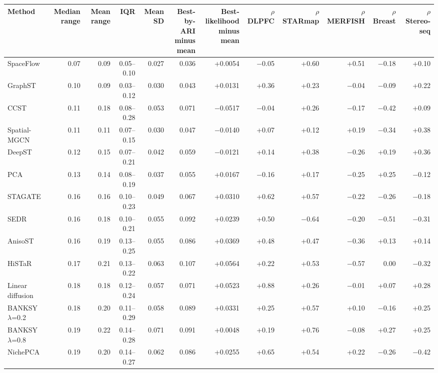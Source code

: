 \scriptsize
\begin{tabular}{lrrrrrrrrrrr}
\toprule
Method & Median range & Mean range & IQR & Mean SD & \shortstack{Best-by-ARI\\minus mean} & \shortstack{Best-likelihood\\minus mean} & \shortstack{$\rho$\\DLPFC} & \shortstack{$\rho$\\STARmap} & \shortstack{$\rho$\\MERFISH} & \shortstack{$\rho$\\Breast} & \shortstack{$\rho$\\Stereo-seq} \\
\midrule
SpaceFlow & 0.07 & 0.09 & 0.05--0.10 & 0.027 & 0.036 & +0.0054 & $-$0.05 & +0.60 & +0.51 & $-$0.18 & +0.10 \\
GraphST & 0.10 & 0.09 & 0.03--0.12 & 0.030 & 0.043 & +0.0131 & +0.36 & +0.23 & $-$0.04 & $-$0.09 & +0.22 \\
CCST & 0.11 & 0.18 & 0.08--0.28 & 0.053 & 0.071 & $-$0.0517 & $-$0.04 & +0.26 & $-$0.17 & $-$0.42 & +0.09 \\
Spatial-MGCN & 0.11 & 0.11 & 0.07--0.15 & 0.030 & 0.047 & $-$0.0140 & +0.07 & +0.12 & +0.19 & $-$0.34 & +0.38 \\
DeepST & 0.12 & 0.15 & 0.07--0.21 & 0.042 & 0.059 & $-$0.0121 & +0.14 & +0.38 & $-$0.26 & +0.19 & +0.36 \\
PCA & 0.13 & 0.14 & 0.08--0.19 & 0.037 & 0.055 & +0.0167 & $-$0.16 & +0.17 & $-$0.25 & +0.25 & $-$0.12 \\
STAGATE & 0.16 & 0.16 & 0.10--0.23 & 0.049 & 0.067 & +0.0310 & +0.62 & +0.57 & $-$0.22 & $-$0.26 & $-$0.18 \\
SEDR & 0.16 & 0.18 & 0.10--0.21 & 0.055 & 0.092 & +0.0239 & +0.50 & $-$0.64 & $-$0.20 & $-$0.51 & $-$0.31 \\
AnisoST & 0.16 & 0.19 & 0.13--0.25 & 0.055 & 0.086 & +0.0369 & +0.48 & +0.47 & $-$0.36 & +0.13 & +0.14 \\
HiSTaR & 0.17 & 0.21 & 0.13--0.22 & 0.063 & 0.107 & +0.0564 & +0.22 & +0.53 & $-$0.57 & 0.00 & $-$0.32 \\
Linear diffusion & 0.18 & 0.18 & 0.12--0.24 & 0.057 & 0.071 & +0.0523 & +0.88 & +0.26 & $-$0.01 & +0.07 & +0.28 \\
BANKSY $\lambda$=0.2 & 0.18 & 0.20 & 0.11--0.29 & 0.058 & 0.089 & +0.0331 & +0.25 & +0.57 & +0.10 & $-$0.16 & +0.25 \\
BANKSY $\lambda$=0.8 & 0.19 & 0.22 & 0.14--0.28 & 0.071 & 0.091 & +0.0048 & +0.19 & +0.76 & $-$0.08 & +0.27 & +0.25 \\
NichePCA & 0.19 & 0.20 & 0.14--0.27 & 0.062 & 0.086 & +0.0255 & +0.65 & +0.54 & +0.22 & $-$0.26 & $-$0.42 \\
\bottomrule
\end{tabular}
